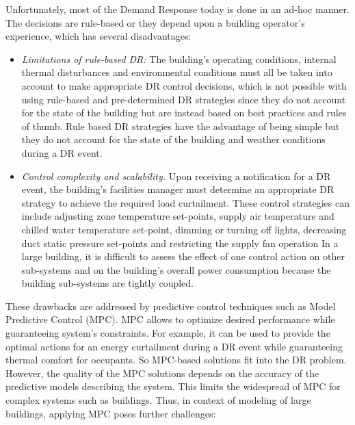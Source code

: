 Unfortunately, most of the Demand Response today is done in an ad-hoc manner. 
The decisions are rule-based or they depend upon a building operator's experience, which has several disadvantages:

\begin{itemize}[leftmargin=0.5cm]
	\item \emph{Limitations of rule-based DR:} The building's operating conditions, internal thermal disturbances and environmental conditions must all be taken into account to make appropriate DR control decisions, which is not possible with using rule-based and pre-determined DR strategies since they do not account for the state of the building but are instead based on best practices and rules of thumb. 
	Rule based DR strategies have the advantage of being simple but they do not account for the state of the building and weather conditions during a DR event.
	\item \emph{Control complexity and scalability.} Upon receiving a notification for a DR event, the building's facilities manager must determine an appropriate DR strategy to achieve the required load curtailment. 
	These control strategies can include adjusting zone temperature set-points, supply air temperature and chilled water temperature set-point, dimming or turning off lights, decreasing duct static pressure set-points and restricting the supply fan operation \etc
	In a large building, it is difficult to assess the effect of one control action on other sub-systems and on the building's overall power consumption because the building sub-systems are tightly coupled.
\end{itemize}
These drawbacks are addressed by predictive control techniques such as Model Predictive Control (MPC). MPC allows to optimize desired performance while guaranteeing system's constraints. For example, it can be used to provide the optimal actions for an energy curtailment during a DR event while guaranteeing thermal comfort for occupants. So MPC-based solutions fit into the DR problem. However, the quality of the MPC solutions depends on the accuracy of the predictive models describing the system. This limits the widespread of MPC for complex systems such as buildings. Thus, in context of modeling of large buildings, applying MPC poses further challenges:

